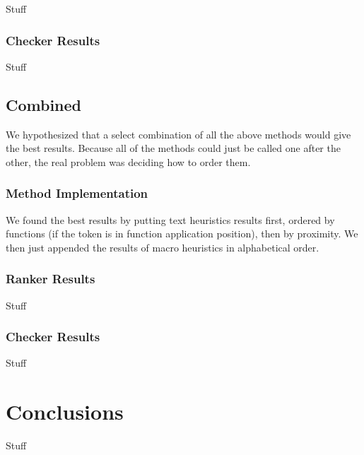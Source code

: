 \documentclass[ms,electronic,twosidetoc,letterpaper,chaptercenter,parttop,lol,lof,lot]{byumsphd}
\begin{document}
Stuff

\subsection{Checker Results}

Stuff

\section{Combined}

We hypothesized that a select combination of all the above methods would give the best results. Because all of the methods could just be called one after the other, the real problem was deciding how to order them.

\subsection{Method Implementation}

We found the best results by putting text heuristics results first, ordered by functions (if the token is in function application position), then by proximity. We then just appended the results of macro heuristics in alphabetical order.

\subsection{Ranker Results}

Stuff

\subsection{Checker Results}

Stuff

\chapter{Conclusions}

Stuff

\nocite{testentry}



\end{document}
